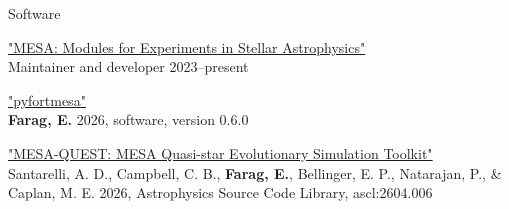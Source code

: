 \begin{rSection}{Software}
\begin{revnumerate}
\item \href{https://docs.mesastar.org/en/latest/about.html}{"MESA: Modules for Experiments in Stellar Astrophysics"}
\\ Maintainer and developer 2023--present

\item \href{https://pypi.org/project/pyfortmesa/}{"pyfortmesa"}
\\ \textbf{Farag, E.} 2026, software, version 0.6.0

\item \href{https://ui.adsabs.harvard.edu/abs/2026ascl.soft04006S/abstract}{"MESA-QUEST: MESA Quasi-star Evolutionary Simulation Toolkit"}
\\ Santarelli, A. D., Campbell, C. B., \textbf{Farag, E.}, Bellinger, E. P., Natarajan, P., \& Caplan, M. E. 2026, Astrophysics Source Code Library, ascl:2604.006

\end{revnumerate}
\end{rSection}
